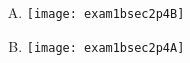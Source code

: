 \documentclass[12pt]{article}
\begin{document}
\begin{enumerate}
\begin{enumerate}[(A)]
	\item \texttt{[image: exam1bsec2p4B]}\hspace{3pc}
	\vspace{3pc}
	
	\item \texttt{[image: exam1bsec2p4A]}\hspace{3pc}
	\vspace{3pc}
\end{enumerate}


\newpage
\begin{comment}
\item {\bf (1 pt ea)} Use the graph of $f$ in the figure to find the following values, if they exist.  If a limit does not exist, write ``DNE".

\begin{center}\texttt{[image: exam1sec2p2]}\end{center}

\vspace{1pc}
\begin{multicols}{3}
\begin{enumerate}
	\item $\lim_{x\to 2^-}f(x)$
	\vspace{2pc}
	
	\item $\lim_{x\to 3}f(x)$
	\vspace{2pc}
	
	\item $\lim_{x\to 1^+}f(x)$
	\vspace{2pc}
	
	\item $f(3)$
	\vspace{2pc}
	
	\item $\lim_{x\to 3^-}f(x)$
	\vspace{2pc}
	
	\item $f(1)$
	\vspace{2pc}
	
	\item $\lim_{x\to 2}f(x)$
	\vspace{2pc}
	

\end{comment}
\end{enumerate}
\end{document}

